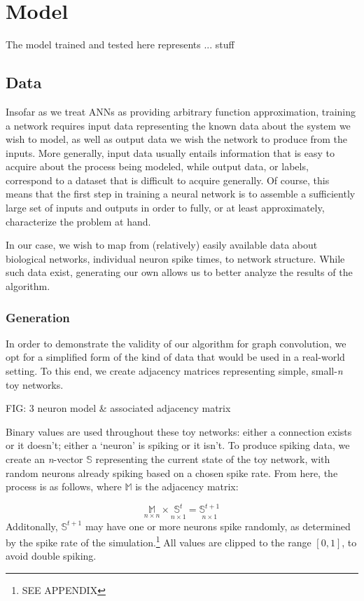 \chapter{Model}
\label{model}
The model trained and tested here represents ... stuff

\section{Data}
\label{sec:data}
Insofar as we treat ANNs as providing arbitrary function approximation, training
a network requires input data representing the known data about the system we
wish to model, as well as output data we wish the network to produce from the
inputs. More generally, input data usually entails information that is easy to 
acquire about the process being modeled, while output data, or labels, 
correspond to a dataset that is difficult to acquire generally. Of course, this 
means that the first step in training a neural network is to assemble a 
sufficiently large set of inputs and outputs in order to fully, or at least 
approximately, characterize the problem at hand.

In our case, we wish to map from (relatively) easily available data about 
biological networks, individual neuron spike times, to network structure. While 
such data exist, generating our own allows us to better analyze the results of 
the algorithm.


\subsection{Generation}
In order to demonstrate the validity of our algorithm for graph convolution, we 
opt for a simplified form of the kind of data that would be used in a real-world 
setting.  To this end, we create adjacency matrices representing simple, 
small-\textit{n} toy networks.

FIG: 3 neuron model \& associated adjacency matrix

Binary values are used throughout these toy networks: either a connection exists 
or it doesn't; either a `neuron' is spiking or it isn't. To produce spiking 
data, we create an \textit{n}-vector $\mathbb{S}$ representing the current state 
of the toy network, with random neurons already spiking based on a chosen spike 
rate. From here, the process is as follows, where $\mathbb{M}$ is the adjacency 
matrix:

\[
	\underset{n \times n}{\mathbb{M}} \times \underset{n \times 1}{\mathbb{S}^t} 
	= \underset{n \times 1}{\mathbb{S}^{t+1}}
\]
Additonally, $\mathbb{S}^{t+1}$ may have one or more neurons spike randomly, as 
determined by the spike rate of the simulation.\footnote{SEE APPENDIX} All 
values are clipped to the range $[0,1]$, to avoid double spiking.

